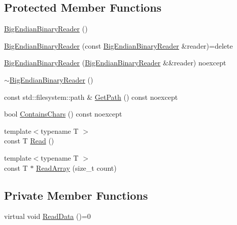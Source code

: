 \subsection*{Protected Member Functions}
\begin{DoxyCompactItemize}
\item 
\mbox{\hyperlink{classmage_1_1_big_endian_binary_reader_a1fd0dbee6950a8cb04aa399f0cdbaf2a}{Big\+Endian\+Binary\+Reader}} ()
\item 
\mbox{\hyperlink{classmage_1_1_big_endian_binary_reader_a9d490263268290217ae4f2f06e0699c4}{Big\+Endian\+Binary\+Reader}} (const \mbox{\hyperlink{classmage_1_1_big_endian_binary_reader}{Big\+Endian\+Binary\+Reader}} \&reader)=delete
\item 
\mbox{\hyperlink{classmage_1_1_big_endian_binary_reader_a16c4303dfb333ebdddfc07c924b9735a}{Big\+Endian\+Binary\+Reader}} (\mbox{\hyperlink{classmage_1_1_big_endian_binary_reader}{Big\+Endian\+Binary\+Reader}} \&\&reader) noexcept
\item 
\mbox{\hyperlink{classmage_1_1_big_endian_binary_reader_ae85a40e8ed06e8c887e38d914843b8d3}{$\sim$\+Big\+Endian\+Binary\+Reader}} ()
\item 
const std\+::filesystem\+::path \& \mbox{\hyperlink{classmage_1_1_big_endian_binary_reader_a1d21e0117af4cbf99152e4a659372364}{Get\+Path}} () const noexcept
\item 
bool \mbox{\hyperlink{classmage_1_1_big_endian_binary_reader_ac6de015b6bbcecdcef58ab074d99fb49}{Contains\+Chars}} () const noexcept
\item 
{\footnotesize template$<$typename T $>$ }\\const T \mbox{\hyperlink{classmage_1_1_big_endian_binary_reader_ac5dca9fec95723379d44e112946a352a}{Read}} ()
\item 
{\footnotesize template$<$typename T $>$ }\\const T $\ast$ \mbox{\hyperlink{classmage_1_1_big_endian_binary_reader_aaab7cf04eb19cc0fe535b9a619feaf21}{Read\+Array}} (size\+\_\+t count)
\end{DoxyCompactItemize}
\subsection*{Private Member Functions}
\begin{DoxyCompactItemize}
\item 
virtual void \mbox{\hyperlink{classmage_1_1_big_endian_binary_reader_a7dc0689d598fa91308597b129516a11d}{Read\+Data}} ()=0
\end{DoxyCompactItemize}
